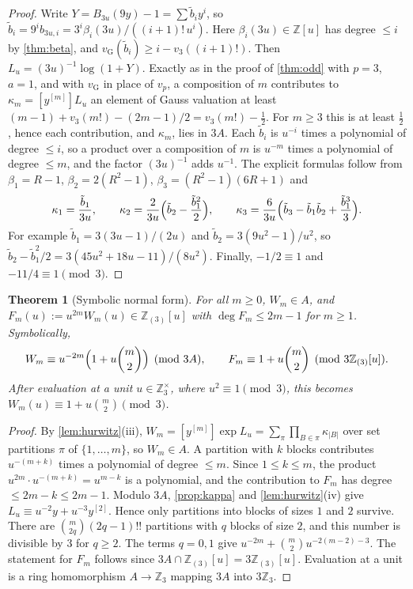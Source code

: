 \documentclass[11pt,reqno]{amsart}
\newtheorem{theorem}{Theorem}[section]
\theoremstyle{definition}
\theoremstyle{remark}
\theoremstyle{plain}
\newcommand{\Z}{\mathbb Z}
\newcommand{\Zloc}{\mathbb Z_{(3)}}
\newcommand{\hy}[1]{[y^{[#1]}]}
\newcommand{\vG}{v_{\mathrm G}}
\begin{document}
\begin{proof}
Write $Y=B_{3u}(9y)-1=\sum \tilde b_iy^i$, so $\tilde b_i=9^ib_{3u,i}=3^i\beta_i(3u)/((i+1)!\,u^i)$. Here $\beta_i(3u)\in\Z[u]$ has degree $\le i$ by \cref{thm:beta}, and $\vG(\tilde b_i)\ge i-v_3((i+1)!)$. Then $L_u=(3u)^{-1}\log(1+Y)$. Exactly as in the proof of \cref{thm:odd} with $p=3$, $a=1$, and with $\vG$ in place of $v_p$, a composition of $m$ contributes to $\kappa_m=\hy mL_u$ an element of Gauss valuation at least $(m-1)+v_3(m!)-(2m-1)/2=v_3(m!)-\tfrac12$. For $m\ge3$ this is at least $\tfrac12$, hence each contribution, and $\kappa_m$, lies in $3A$. Each $\tilde b_i$ is $u^{-i}$ times a polynomial of degree $\le i$, so a product over a composition of $m$ is $u^{-m}$ times a polynomial of degree $\le m$, and the factor $(3u)^{-1}$ adds $u^{-1}$. The explicit formulas follow from $\beta_1=R-1$, $\beta_2=2(R^2-1)$, $\beta_3=(R^2-1)(6R+1)$ and
\[
\kappa_1=\frac{\tilde b_1}{3u},\qquad \kappa_2=\frac{2}{3u}\Bigl(\tilde b_2-\frac{\tilde b_1^2}2\Bigr),\qquad \kappa_3=\frac{6}{3u}\Bigl(\tilde b_3-\tilde b_1\tilde b_2+\frac{\tilde b_1^3}{3}\Bigr).
\]
For example $\tilde b_1=3(3u-1)/(2u)$ and $\tilde b_2=3(9u^2-1)/u^2$, so $\tilde b_2-\tilde b_1^2/2=3(45u^2+18u-11)/(8u^2)$. Finally, $-1/2\equiv1$ and $-11/4\equiv1\pmod 3$.
\end{proof}

\begin{theorem}[Symbolic normal form]\label{thm:normalform}
For all $m\ge0$, $W_m\in A$, and $F_m(u):=u^{2m}W_m(u)\in\Zloc[u]$ with $\deg F_m\le2m-1$ for $m\ge1$. Symbolically,
\[
W_m\equiv u^{-2m}\Bigl(1+u\binom m2\Bigr)\pmod{3A},\qquad F_m\equiv1+u\binom m2\pmod{3\Zloc[u]} .
\]
After evaluation at a unit $u\in\Z_3^\times$, where $u^2\equiv1\pmod 3$, this becomes $W_m(u)\equiv1+u\binom m2\pmod 3$.
\end{theorem}

\begin{proof}
By \cref{lem:hurwitz}(iii), $W_m=\hy m\exp L_u=\sum_\pi\prod_{B\in\pi}\kappa_{|B|}$ over set partitions $\pi$ of $\{1,\dots,m\}$, so $W_m\in A$. A partition with $k$ blocks contributes $u^{-(m+k)}$ times a polynomial of degree $\le m$. Since $1\le k\le m$, the product $u^{2m}\cdot u^{-(m+k)}=u^{m-k}$ is a polynomial, and the contribution to $F_m$ has degree $\le2m-k\le2m-1$. Modulo $3A$, \cref{prop:kappa} and \cref{lem:hurwitz}(iv) give $L_u\equiv u^{-2}y+u^{-3}y^{[2]}$. Hence only partitions into blocks of sizes $1$ and $2$ survive. There are $\binom m{2q}(2q-1)!!$ partitions with $q$ blocks of size $2$, and this number is divisible by $3$ for $q\ge2$. The terms $q=0,1$ give $u^{-2m}+\binom m2u^{-2(m-2)-3}$. The statement for $F_m$ follows since $3A\cap\Zloc[u]=3\Zloc[u]$. Evaluation at a unit is a ring homomorphism $A\to\Z_3$ mapping $3A$ into $3\Z_3$.
\end{proof}
\end{document}
